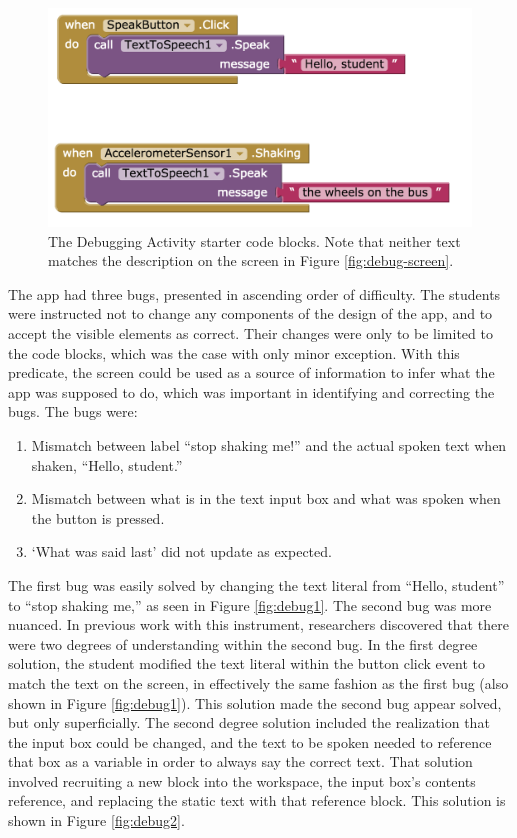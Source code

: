 \begin{figure}
  \centering
      \includegraphics[width=\textwidth]{images/debugActivity/debug0start}
  \caption[The Debugging Activity starter code blocks]{The Debugging Activity starter code blocks. Note that neither text matches the description on the screen in Figure \ref{fig:debug-screen}.}
  \label{fig:debug0}
\end{figure}


The app had three bugs, presented in ascending order of difficulty. The students were instructed not to change any components of the design of the app, and to accept the visible elements as correct. Their changes were only to be limited to the code blocks, which was the case with only minor exception. With this predicate, the screen could be used as a source of information to infer what the app was supposed to do, which was important in identifying and correcting the bugs. The bugs were:

\begin{enumerate}
\item Mismatch between label ``stop shaking me!'' and the actual spoken text when shaken, ``Hello, student.''
\item Mismatch between what is in the text input box and what was spoken when the button is pressed.
\item `What was said last' did not update as expected.
\end{enumerate}

The first bug was easily solved by changing the text literal from ``Hello, student'' to ``stop shaking me,'' as seen in Figure \ref{fig:debug1}. The second bug was more nuanced. In previous work with this instrument, researchers discovered that there were two degrees of understanding within the second bug. In the first degree solution, the student modified the text literal within the button click event to match the text on the screen, in effectively the same fashion as the first bug (also shown in Figure \ref{fig:debug1}). This solution made the second bug appear solved, but only superficially. The second degree solution included the realization that the input box could be changed, and the text to be spoken needed to reference that box as a variable in order to always say the correct text. That solution involved recruiting a new block into the workspace, the input box's contents reference, and replacing the static text with that reference block. This solution is shown in Figure \ref{fig:debug2}.

